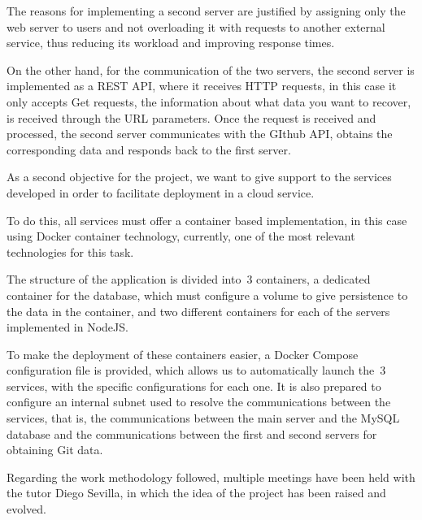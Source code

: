 The reasons for implementing a second server are justified by
assigning only the web server to users and not overloading it with
requests to another external service, thus reducing its workload and
improving response times.

On the other hand, for the communication of the two servers, the
second server is implemented as a REST API, where it receives HTTP
requests, in this case it only accepts Get requests, the information
about what data you want to recover, is received through the URL
parameters. Once the request is received and processed, the second
server communicates with the GIthub API, obtains the corresponding
data and responds back to the first server.

As a second objective for the project, we want to give support to the
services developed in order to facilitate deployment in a cloud
service.

To do this, all services must offer a container based implementation,
in this case using Docker container technology, currently, one of
the most relevant technologies for this task.

The structure of the application is divided into~3 containers, a
dedicated container for the database, which must configure a volume to
give persistence to the data in the container, and two different
containers for each of the servers implemented in NodeJS.

To make the deployment of these containers easier, a Docker Compose
configuration file is provided, which allows us to automatically
launch the~3 services, with the specific configurations for each one.
It is also prepared to configure an internal subnet used to resolve
the communications between the services, that is, the communications
between the main server and the MySQL database and the communications
between the first and second servers for obtaining Git data.

Regarding the work methodology followed, multiple meetings have been
held with the tutor Diego Sevilla, in which the idea of the project
has been raised and evolved.




